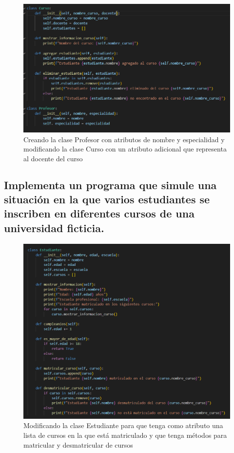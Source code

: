 \documentclass[11pt,a4paper]{article}
\begin{document}
\begin{figure}[H]
    \centering
    \includegraphics[width=1\linewidth]{images/14.png}
    \caption{Creando la clase Profesor con atributos de nombre y especialidad y modificando la clase Curso con un atributo adicional que representa al docente del curso}
    \label{fig:enter-label}
\end{figure}

\subsection{Implementa un programa que simule una situación en la que varios estudiantes se inscriben en diferentes cursos de una universidad ficticia.}

\begin{figure}[H]
    \centering
    \includegraphics[width=1\linewidth]{images/15.png}
    \caption{Modificando la clase Estudiante para que tenga como atributo una lista de cursos en la que está matriculado y que tenga métodos para matricular y desmatricular de cursos}
    \label{fig:enter-label}
\end{figure}
\end{document}
